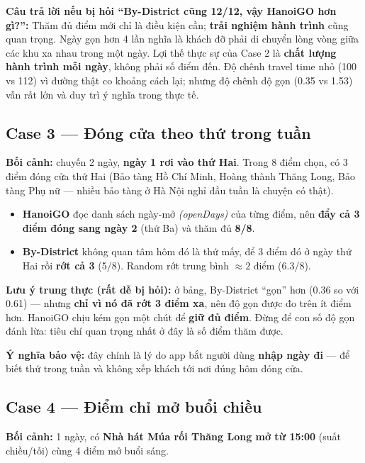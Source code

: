 \documentclass[12pt,a4paper]{article}
\newcommand{\en}[1]{\textit{(#1)}}            %
\begin{document}
\textbf{Câu trả lời nếu bị hỏi ``By-District cũng 12/12, vậy HanoiGO hơn gì?'':}
Thăm đủ điểm mới chỉ là điều kiện cần; \textbf{trải nghiệm hành trình} cũng quan
trọng. Ngày gọn hơn 4 lần nghĩa là khách đỡ phải di chuyển lòng vòng giữa các
khu xa nhau trong một ngày. Lợi thế thực sự của Case 2 là \textbf{chất lượng
hành trình mỗi ngày}, không phải số điểm đến. Độ chênh travel time nhỏ (100 vs
112) vì đường thật co khoảng cách lại; nhưng độ chênh độ gọn (0.35 vs 1.53) vẫn
rất lớn và duy trì ý nghĩa trong thực tế.

\subsection*{Case 3 --- Đóng cửa theo thứ trong tuần}

\textbf{Bối cảnh:} chuyến 2 ngày, \textbf{ngày 1 rơi vào thứ Hai}. Trong 8 điểm
chọn, có 3 điểm đóng cửa thứ Hai (Bảo tàng Hồ Chí Minh, Hoàng thành Thăng Long,
Bảo tàng Phụ nữ --- nhiều bảo tàng ở Hà Nội nghỉ đầu tuần là chuyện có thật).

\begin{itemize}[nosep]
  \item \textbf{HanoiGO} đọc danh sách ngày-mở \en{openDays} của từng điểm, nên
  \textbf{đẩy cả 3 điểm đóng sang ngày 2} (thứ Ba) và thăm đủ \textbf{8/8}.
  \item \textbf{By-District} không quan tâm hôm đó là thứ mấy, để 3 điểm đó ở
  ngày thứ Hai rồi \textbf{rớt cả 3} (5/8). Random rớt trung bình $\approx 2$
  điểm (6.3/8).
\end{itemize}

\textbf{Lưu ý trung thực (rất dễ bị hỏi):} ở bảng, By-District ``gọn'' hơn
(0.36 so với 0.61) --- nhưng \textbf{chỉ vì nó đã rớt 3 điểm xa}, nên độ gọn được
đo trên ít điểm hơn. HanoiGO chịu kém gọn một chút để \textbf{giữ đủ điểm}. Đừng
để con số độ gọn đánh lừa: tiêu chí quan trọng nhất ở đây là số điểm thăm được.

\textbf{Ý nghĩa bảo vệ:} đây chính là lý do app bắt người dùng \textbf{nhập ngày
đi} --- để biết thứ trong tuần và không xếp khách tới nơi đúng hôm đóng cửa.

\subsection*{Case 4 --- Điểm chỉ mở buổi chiều}

\textbf{Bối cảnh:} 1 ngày, có \textbf{Nhà hát Múa rối Thăng Long mở từ 15:00}
(suất chiều/tối) cùng 4 điểm mở buổi sáng.
\end{document}
